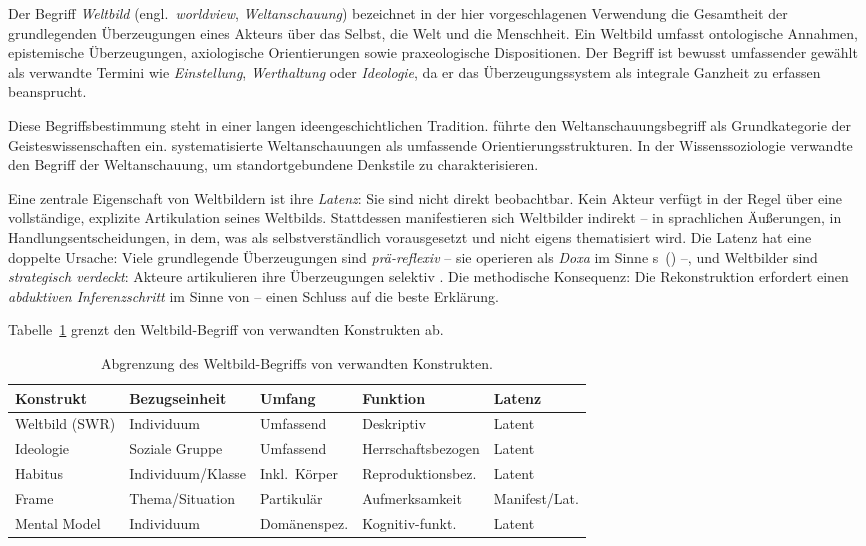 \documentclass[11pt,a4paper]{article}
\theoremstyle{definition}
\theoremstyle{plain}
\theoremstyle{remark}
\begin{document}
Der Begriff \emph{Weltbild} (engl.\ \emph{worldview}, \emph{Weltanschauung}) bezeichnet in der hier vorgeschlagenen Verwendung die Gesamtheit der grundlegenden \"Uberzeugungen eines Akteurs \"uber das Selbst, die Welt und die Menschheit. Ein Weltbild umfasst ontologische Annahmen, epistemische \"Uberzeugungen, axiologische Orientierungen sowie praxeologische Dispositionen. Der Begriff ist bewusst umfassender gew\"ahlt als verwandte Termini wie \emph{Einstellung}, \emph{Werthaltung} oder \emph{Ideologie}, da er das \"Uberzeugungssystem als integrale Ganzheit zu erfassen beansprucht.

Diese Begriffsbestimmung steht in einer langen ideengeschichtlichen Tradition. \citet{Dilthey1911} f\"uhrte den Weltanschauungsbegriff als Grundkategorie der Geisteswissenschaften ein. \citet{Jaspers1919} systematisierte Weltanschauungen als umfassende Orientierungsstrukturen. In der Wissenssoziologie verwandte \citet{Mannheim1929} den Begriff der Weltanschauung, um standortgebundene Denkstile zu charakterisieren.

Eine zentrale Eigenschaft von Weltbildern ist ihre \emph{Latenz}: Sie sind nicht direkt beobachtbar. Kein Akteur verf\"ugt in der Regel \"uber eine vollst\"andige, explizite Artikulation seines Weltbilds. Stattdessen manifestieren sich Weltbilder indirekt -- in sprachlichen \"Au\ss{}erungen, in Handlungsentscheidungen, in dem, was als selbstverst\"andlich vorausgesetzt und nicht eigens thematisiert wird. Die Latenz hat eine doppelte Ursache: Viele grundlegende \"Uberzeugungen sind \emph{pr\"a-reflexiv} -- sie operieren als \emph{Doxa} im Sinne \citeauthor{Bourdieu1977}s~(\citeyear{Bourdieu1977}) --, und Weltbilder sind \emph{strategisch verdeckt}: Akteure artikulieren ihre \"Uberzeugungen selektiv \citep{Goffman1959}. Die methodische Konsequenz: Die Rekonstruktion erfordert einen \emph{abduktiven Inferenzschritt} im Sinne von \citet{Peirce1903} -- einen Schluss auf die beste Erkl\"arung.

Tabelle~\ref{tab:konstrukte} grenzt den Weltbild-Begriff von verwandten Konstrukten ab.

\begin{table}[htbp]
  \centering
  \caption{Abgrenzung des Weltbild-Begriffs von verwandten Konstrukten.}
  \label{tab:konstrukte}
  \begin{tabularx}{\textwidth}{l X l l l}
    \toprule
    \textbf{Konstrukt} & \textbf{Bezugseinheit} & \textbf{Umfang} & \textbf{Funktion} & \textbf{Latenz} \\
    \midrule
    Weltbild (SWR) & Individuum & Umfassend & Deskriptiv & Latent \\
    Ideologie & Soziale Gruppe & Umfassend & Herrschaftsbezogen & Latent \\
    Habitus & Individuum/Klasse & Inkl.\ K\"orper & Reproduktionsbez. & Latent \\
    Frame & Thema/Situation & Partikul\"ar & Aufmerksamkeit & Manifest/Lat. \\
    Mental Model & Individuum & Dom\"anenspez. & Kognitiv-funkt. & Latent \\
    \bottomrule
  \end{tabularx}
\end{table}
\end{document}
